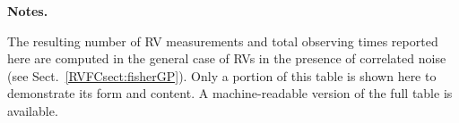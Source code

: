 \begin{landscape}
\begin{table*}
\begin{tabular}{ccccccccccc}
\end{tabular}
\begin{list}{}{}
\item {\bf{Notes.}}
\item The resulting number of RV measurements and total observing times reported here are computed in the general case of RVs in the presence of correlated noise (see Sect.~\ref{RVFCsect:fisherGP}). Only a portion of this table is shown here to demonstrate its form and content. A machine-readable version of the full table is available.
\end{list}
\end{table*}
\clearpage
\end{landscape}

